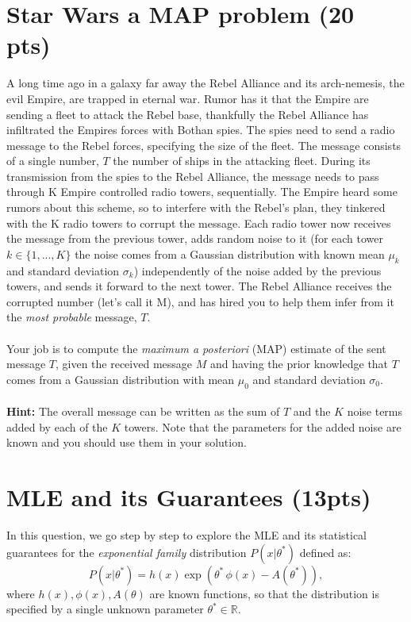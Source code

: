 \documentclass{article}
\newenvironment{soln}{
	\leavevmode\color{blue}\ignorespaces
}{}
\begin{document}
\section{Star Wars a MAP problem (20 pts)}
A long time ago in a galaxy far away the Rebel Alliance and its arch-nemesis, the evil Empire, are trapped in eternal war. Rumor has it that the Empire are sending a fleet to attack the Rebel base, thankfully the Rebel Alliance has infiltrated the Empires forces with Bothan spies. The spies need to send a radio message to the Rebel forces, specifying the size of the fleet. The message consists of a single number, $T$ the number of ships in the attacking fleet. During its transmission from the spies to the Rebel Alliance, the message needs to pass through K Empire controlled radio towers, sequentially. The Empire heard some rumors about this scheme, so to interfere with the Rebel's plan, they tinkered with the K radio towers to corrupt the message. Each radio tower now receives the message from the previous tower, adds random noise to it (for each tower $k \in \{1,...,K\}$ the noise comes from a Gaussian distribution with known mean $\mu_k$ and standard deviation $\sigma_k$) independently of the noise added by the previous towers, and sends it forward to the next tower. The Rebel Alliance receives the corrupted number (let's call it M), and has hired you to help them infer from it the \textit{most probable} message, $T$.\\\\
Your job is to compute the \textit{maximum a posteriori} (MAP) estimate of the sent message $T$, given the received message $M$ and having the prior knowledge that $T$ comes from a Gaussian distribution with mean $\mu_0$ and standard deviation $\sigma_0$.\\\\
\textbf{Hint:} The overall message can be written as the sum of $T$ and the $K$ noise terms added by each of the $K$ towers. Note that the parameters for the added noise are known and you should use them in your solution.



\begin{soln}

\end{soln}

\newpage



\section{MLE and its Guarantees (13pts)}
In this question, we go step by step to explore the MLE and its statistical guarantees for the \emph{exponential family} distribution $P(x|\theta^*)$ defined as:
\begin{equation}\label{eqn:expFamily}
P(x | \theta^*) = h(x) \exp(\theta^* \, \phi(x) - A(\theta^*)),
\end{equation}  
where $h(x), \phi(x), A(\theta)$ are known functions, so that the distribution is specified by a single unknown parameter $\theta^* \in \mathbb{R}$.
\end{document}
